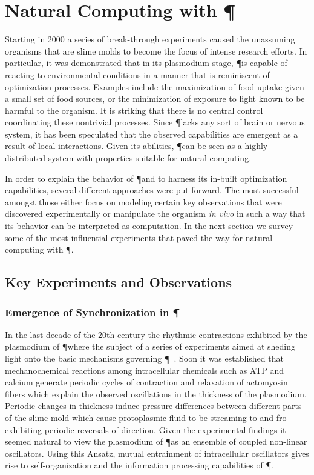 
\section{Natural Computing with \P}\label{sec:natural_computing_physarum}

	Starting in 2000 a series of break-through experiments caused the unassuming organisms that are slime molds to become the focus of intense research efforts. In particular, it was demonstrated that in its plasmodium stage, \P is capable of reacting to environmental conditions in a manner that is reminiscent of optimization processes. Examples include the maximization of food uptake given a small set of food sources, or the minimization of exposure to light known to be harmful to the organism. It is striking that there is no central control coordinating these nontrivial processes. Since \P lacks any sort of brain or nervous system, it has been speculated that the observed capabilities are emergent as a result of local interactions. Given its abilities, \P can be seen as a highly distributed system with properties suitable for natural computing.

	In order to explain the behavior of \P and to harness its in-built optimization capabilities, several different approaches were put forward. The most successful amongst those either focus on modeling certain key observations that were discovered experimentally or manipulate the organism \textit{in vivo} in such a way that its behavior can be interpreted as computation. In the next section we survey some of the most influential experiments that paved the way for natural computing with \P.

	\subsection{Key Experiments and Observations}

		\subsubsection{Emergence of Synchronization in \P }
		
			In the last decade of the 20th century the rhythmic contractions exhibited by the plasmodium of \P where the subject of a series of experiments aimed at sheding light onto the basic mechanisms governing \P~\cite{MIYAKE1996341,NAKAGAKI1996261,TAKAHASHI1997105}. Soon it was established that mechanochemical reactions among intracellular chemicals such as ATP and calcium generate periodic cycles of contraction and relaxation of actomyosin fibers which explain the observed oscillations in the thickness of the plasmodium. Periodic changes in thickness induce pressure differences between different parts of the slime mold which cause protoplasmic fluid to be streaming to and fro exhibiting periodic reversals of direction. Given the experimental findings it seemed natural to view the plasmodium of \P as an ensemble of coupled non-linear oscillators. Using this Ansatz, mutual entrainment of intracellular oscillators gives rise to self-organization and the information processing capabilities of \P. 

